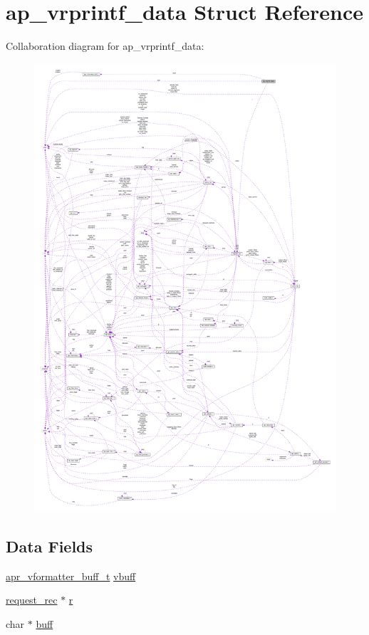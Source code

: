 \hypertarget{structap__vrprintf__data}{}\section{ap\+\_\+vrprintf\+\_\+data Struct Reference}
\label{structap__vrprintf__data}


Collaboration diagram for ap\+\_\+vrprintf\+\_\+data\+:
\nopagebreak
\begin{figure}[H]
\begin{center}
\leavevmode
\includegraphics[width=350pt]{structap__vrprintf__data__coll__graph}
\end{center}
\end{figure}
\subsection*{Data Fields}
\begin{DoxyCompactItemize}
\item 
\hyperlink{structapr__vformatter__buff__t}{apr\+\_\+vformatter\+\_\+buff\+\_\+t} \hyperlink{structap__vrprintf__data_a1a17c5920b17a91c110cb3d634366693}{vbuff}
\item 
\hyperlink{structrequest__rec}{request\+\_\+rec} $\ast$ \hyperlink{structap__vrprintf__data_aa9772c8fd73d66ad86d98fa8dd578ce2}{r}
\item 
char $\ast$ \hyperlink{structap__vrprintf__data_abc9985e5c40187c49a0698ffbf61de07}{buff}
\end{DoxyCompactItemize}


